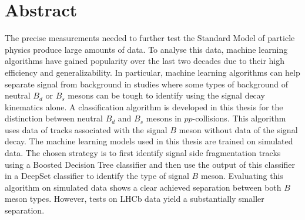 \thispagestyle{plain}

\section*{Abstract}
The precise measurements needed to further test the Standard Model of particle physics produce large amounts of data.
To analyse this data, machine learning algorithms have gained popularity over the last two decades due to their high efficiency and generalizability.
In particular, machine learning algorithms can help separate signal from background in studies where some types of background of neutral $B_d$ or $B_s$ mesons can be tough to identify using the signal decay kinematics alone.
A classification algorithm is developed in this thesis for the distinction between neutral $B_d$ and $B_s$ mesons in $pp$-collisions. %
This algorithm uses data of tracks associated with the signal $B$ meson without data of the signal decay. 
The machine learning models used in this thesis are trained on simulated data. %
The chosen strategy is to first identify signal side fragmentation tracks using a Boosted Decision Tree classifier and then use the output of this classifier in a DeepSet classifier to identify the type of signal $B$ meson.
Evaluating this algorithm on simulated data shows a clear achieved separation between both $B$ meson types.
However, tests on LHCb data yield a substantially smaller separation.

